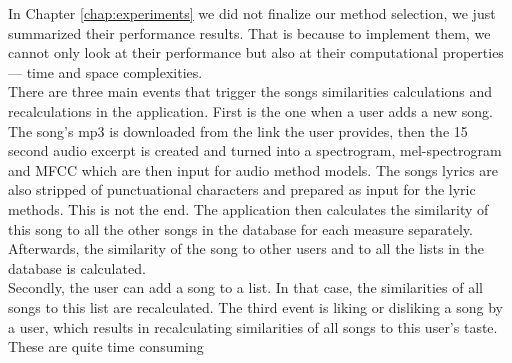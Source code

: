 In Chapter \ref{chap:experiments} we did not finalize our method selection, we just summarized their performance results. That is because to implement them, we cannot only look at their performance but also at their computational properties --- time and space complexities. \\
There are three main events that trigger the songs similarities calculations and recalculations in the application. First is the one when a user adds a new song. The song's mp3 is downloaded from the link the user provides, then the 15 second audio excerpt is created and turned into a spectrogram, mel-spectrogram and MFCC which are then input for audio method models. The songs lyrics are also stripped of punctuational characters and prepared as input for the lyric methods. This is not the end. The application then calculates the similarity of this song to all the other songs in the database for each measure separately. Afterwards, the similarity of the song to other users and to all the lists in the database is calculated. \\
Secondly, the user can add a song to a list. In that case, the similarities of all songs to this list are recalculated. The third event is liking or disliking a song by a user, which results in recalculating similarities of all songs to this user's taste. \\
These are quite time consuming 
